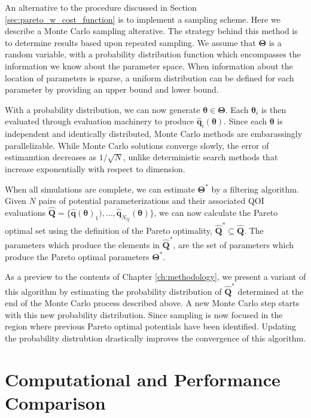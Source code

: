 An alternative to the procedure discussed in Section \ref{sec:pareto_w_cost_function} is to implement a sampling scheme.  Here we describe a Monte Carlo sampling alterative.  The strategy behind this method is to determine results based upon repeated sampling.  We assume that $\bm{\Theta}$ is a random variable, with a probability distribution function which encompasses the information we know about the parameter space.  When information about the location of parameters is sparse, a uniform distribution can be defined for each parameter by providing an upper bound and lower bound.

With a probability distribution, we can now generate $\bm{\theta} \in \bm{\Theta}$.  Each $\bm{\theta}_i$ is then evaluated through evaluation machinery to produce $\hat{\bm{q}}_i(\bm{\theta})$.
Since each $\bm{\theta}$  is independent and identically distributed, Monte Carlo methods are embarassingly parallelizable.  While Monte Carlo solutions converge slowly, the error of estimamtion decreases as $1/\sqrt{N}$, unlike deterministic search methods that increase exponentially with respect to dimension\cite{caflisch1998_mc}.

When all simulations are complete, we can estimate $\bm{\Theta}^*$ by a filtering algorithm.  Given $N$ pairs of potential parameterizations and their associated QOI evaluations $\hat{\bm{Q}}=\{\hat{\bm{q}}(\bm{\theta})_1),...,\hat{\bm{q}}_{N_Q}(\bm{\theta})\}$, we can now calculate the Pareto optimal set using the definition of the Pareto optimality, $\hat{\bm{Q}}^* \subseteq \hat{\bm{Q}}$.   The parameters which produce the elements in $\hat{\bm{Q}}^*$, are the set of parameters which produce the Pareto optimal parameters $\bm{\Theta}^*$.

As a preview to the contents of Chapter \ref{ch:methodology}, we present a variant of this algorithm by estimating the probability distribution of $\hat{\bm{Q}}^*$ determined at the end of the Monte Carlo process described above.  A new Monte Carlo step starts with this new probability distribution.  Since sampling is now focused in the region where previous Pareto optimal potentials have been identified.   Updating the probability distrubtion drastically improves the convergence of this algorithm.

\section{Computational and Performance Comparison}


